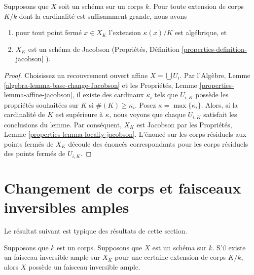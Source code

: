 \begin{lemma}
\label{lemma-make-Jacobson}
Supposons que $X$ soit un schéma sur un corps
$k$. Pour toute extension de corps $K/k$ dont la
cardinalité est suffisamment grande, nous avons
\begin{enumerate}
\item pour tout point fermé $x \in X_K$
l'extension $\kappa(x)/K$ est algébrique, et
\item $X_K$ est un schéma de Jacobson (Propriétés,
Définition \ref{properties-definition-jacobson} ).
\end{enumerate}
\end{lemma}

\begin{proof}
Choisissez un recouvrement ouvert affine $X =
\bigcup U_i$. Par l'Algèbre, Lemme
\ref{algebra-lemma-base-change-Jacobson} et les
Propriétés, Lemme
\ref{properties-lemma-affine-jacobson}, il existe des
cardinaux $\kappa_i$ tels que $U_{i, K}$ possède les
propriétés souhaitées sur $K$ si $\#(K) \geq \kappa_i$.
Posez $\kappa = \max\{\kappa_i\}$. Alors, si la cardinalité
de $K$ est supérieure à $\kappa$, nous voyons que chaque
$U_{i, K}$ satisfait les conclusions du lemme. Par
conséquent, $X_K$ est Jacobson par les Propriétés, Lemme
\ref{properties-lemma-locally-jacobson}. L'énoncé sur les corps
résiduels aux points fermés de $X_K$ découle des énoncés
correspondants pour les corps résiduels des points fermés de $U_{i, K}$.
\end{proof}





\section{Changement de corps et faisceaux inversibles amples}
\label{section-change-fields-ample}

\noindent
Le résultat suivant est typique des résultats de cette section.

\begin{lemma}
\label{lemma-ample-after-field-extension}
Supposons que $k$ est un corps. Supposons que $X$ est
un schéma sur $k$. S'il existe un faisceau inversible
ample sur $X_K$ pour une certaine extension de corps
$K/k$, alors $X$ possède un faisceau inversible ample.
\end{lemma}

